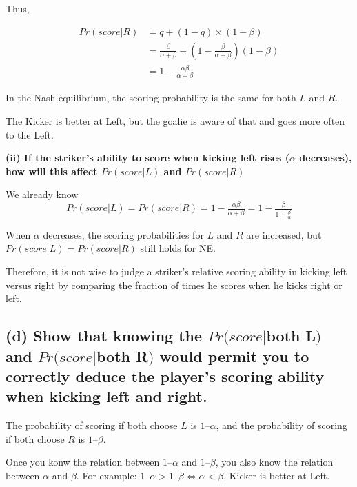 \documentclass{article}
\begin{document}
\smallskip

Thus, 

\begin{align*}
Pr(score|R) &= q + (1-q)\times (1-\beta)  \\
&= \tfrac{\beta}{\alpha + \beta} + (1-\tfrac{\beta}{\alpha + \beta}) (1-\beta) \\
&=  1- \tfrac{\alpha \beta }{\alpha + \beta}
\end{align*}

In the Nash equilibrium, the scoring probability is the same for both $L$ and $R$.


\begin{mdframed}[backgroundcolor=blue!20,linecolor=white]
The Kicker is better at Left, but the goalie is aware of that and goes more often to the Left.

\end{mdframed}


\textbf{(ii) If the striker's ability to score when kicking left rises ($\alpha$ decreases), how will this affect $Pr(score|L)$ and $Pr(score|R)$}

\smallskip

We already know $$Pr(score|L) = Pr(score|R)= 1- \tfrac{\alpha \beta }{\alpha + \beta} =  1- \tfrac{\beta }{1 + \frac{\beta}{\alpha}}$$

When $\alpha$ decreases, the scoring probabilities for $L$ and $R$ are increased, but $Pr(score|L) = Pr(score|R)$ still holds for NE.

\medskip

Therefore, it is not wise to judge a striker's relative scoring ability in kicking left versus right by comparing the fraction of times he scores when he kicks right or left.


\subsection*{(d) Show that knowing the $Pr(score|$both L$)$ and $Pr(score|$both R$)$ would permit you to correctly deduce the player's scoring ability when kicking left and right.}

The probability of scoring if both choose $L$ is $1 – \alpha$, and the probability of scoring if both choose $R$ is $1 – \beta$. 


Once you konw the relation between $1 – \alpha$ and $1 – \beta$, you also know the relation between $\alpha$ and $\beta $. For example: $1 – \alpha > 1 – \beta \iff \alpha <  \beta $, Kicker is better at Left.
\end{document}

